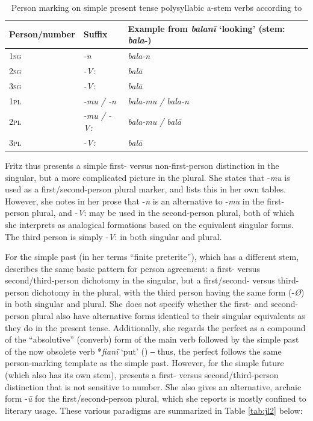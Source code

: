 \documentclass[output=paper]{langsci/langscibook}
\begin{document}
\begin{table}
\begin{tabularx}{\textwidth}{lll}
\hline
\textbf{Person/number} & \textbf{Suffix} & \textbf{Example from \textit{balanī} ‘looking’ (stem: \textit{bala}-)}\\
\hline
\textsc{	1sg	}	&	\textit{	-n	}	&	\textit{	bala-n	}	\\
\textsc{	2sg	}	&	\textit{	-V:	}	&	\textit{	balā	}	\\
\textsc{	3sg	}	&	\textit{	-V:	}	&	\textit{	balā	}	\\
\textsc{	1pl	}	&	\textit{	-mu / -n	}	&	\textit{	bala-mu / bala-n	}	\\
\textsc{	2pl	}	&	\textit{	-mu / -V:	}	&	\textit{	bala-mu / balā	}	\\
\textsc{	3pl	}	&	\textit{	-V:	}	&	\textit{	balā	}	\\
\hline
\end{tabularx}
\caption{Person marking on simple present tense polysyllabic a-stem verbs according to \cite[168--169]{Fritz2002}}
\label{tab:jl1}
\end{table}

Fritz thus presents a simple first- versus non-first-person distinction in the singular, but a more complicated picture in the plural. She states that -\textit{mu} is used as a first/second-person plural marker, and lists this in her own tables. However, she notes in her prose that -\textit{n} is an alternative to -\textit{mu} in the first-person plural, and -\textit{V}: may be used in the second-person plural, both of which she interprets as analogical formations based on the equivalent singular forms. The third person is simply -\textit{V}: in both singular and plural. 

   For the simple past (in her terms “finite preterite”), which has a different stem, \cite[174--176]{Fritz2002} describes the same basic pattern for person agreement: a first- versus second/third-person dichotomy in the singular, but a first/second- versus third-person dichotomy in the plural, with the third person having the same form (-\textit{Ø}) in both singular and plural. She does not specify whether the first- and second-person plural also have alternative forms identical to their singular equivalents as they do in the present tense. Additionally, she regards the perfect as a compound of the “absolutive” (converb) form of the main verb followed by the simple past of the now obsolete verb *\textit{fianī} ‘put’ (\citealt[225--226]{Fritz2002}) ‒ thus, the perfect follows the same person-marking template as the simple past. However, for the simple future (which also has its own stem), \cite[176‒178]{Fritz2002} presents a first- versus second/third-person distinction that is not sensitive to number. She also gives an alternative, archaic form -\textit{ū} for the first/second-person plural, which she reports is mostly confined to literary usage. These various paradigms are summarized in Table \ref{tab:jl2} below:
   
\end{document}

